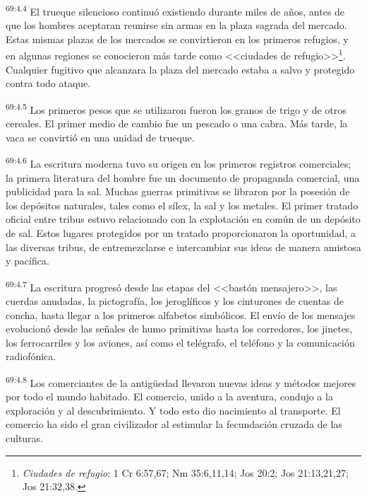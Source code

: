 \par
\textsuperscript{69:4.4} El trueque silencioso continuó existiendo durante miles de años, antes de que los hombres aceptaran reunirse sin armas en la plaza sagrada del mercado. Estas mismas plazas de los mercados se convirtieron en los primeros refugios, y en algunas regiones se conocieron más tarde como <<ciudades de refugio>>\footnote{\textit{Ciudades de refugio}: 1 Cr 6:57,67; Nm 35:6,11,14; Jos 20:2; Jos 21:13,21,27; Jos 21:32,38.}. Cualquier fugitivo que alcanzara la plaza del mercado estaba a salvo y protegido contra todo ataque.

\par
\textsuperscript{69:4.5} Los primeros pesos que se utilizaron fueron los granos de trigo y de otros cereales. El primer medio de cambio fue un pescado o una cabra. Más tarde, la vaca se convirtió en una unidad de trueque.

\par
\textsuperscript{69:4.6} La escritura moderna tuvo su origen en los primeros registros comerciales; la primera literatura del hombre fue un documento de propaganda comercial, una publicidad para la sal. Muchas guerras primitivas se libraron por la posesión de los depósitos naturales, tales como el sílex, la sal y los metales. El primer tratado oficial entre tribus estuvo relacionado con la explotación en común de un depósito de sal. Estos lugares protegidos por un tratado proporcionaron la oportunidad, a las diversas tribus, de entremezclarse e intercambiar sus ideas de manera amistosa y pacífica.

\par
\textsuperscript{69:4.7} La escritura progresó desde las etapas del <<bastón mensajero>>, las cuerdas anudadas, la pictografía, los jeroglíficos y los cinturones de cuentas de concha, hasta llegar a los primeros alfabetos simbólicos. El envío de los mensajes evolucionó desde las señales de humo primitivas hasta los corredores, los jinetes, los ferrocarriles y los aviones, así como el telégrafo, el teléfono y la comunicación radiofónica.

\par
\textsuperscript{69:4.8} Los comerciantes de la antig\"uedad llevaron nuevas ideas y métodos mejores por todo el mundo habitado. El comercio, unido a la aventura, condujo a la exploración y al descubrimiento. Y todo esto dio nacimiento al transporte. El comercio ha sido el gran civilizador al estimular la fecundación cruzada de las culturas.

